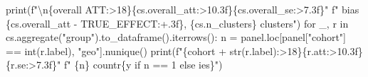 \documentclass[
  letterpaper,
  10pt,
  twoside,
  openright,
  numbers=noenddot,
  chapterprefix=true]{scrbook}
\newenvironment{Shaded}{}{}
\newcommand{\BuiltInTok}[1]{\textcolor[rgb]{0.84,0.23,0.29}{#1}}
\newcommand{\CharTok}[1]{\textcolor[rgb]{0.01,0.18,0.38}{#1}}
\newcommand{\ControlFlowTok}[1]{\textcolor[rgb]{0.84,0.23,0.29}{#1}}
\newcommand{\DecValTok}[1]{\textcolor[rgb]{0.00,0.36,0.77}{#1}}
\newcommand{\KeywordTok}[1]{\textcolor[rgb]{0.84,0.23,0.29}{#1}}
\newcommand{\NormalTok}[1]{\textcolor[rgb]{0.14,0.16,0.18}{#1}}
\newcommand{\OperatorTok}[1]{\textcolor[rgb]{0.14,0.16,0.18}{#1}}
\newcommand{\SpecialCharTok}[1]{\textcolor[rgb]{0.00,0.36,0.77}{#1}}
\newcommand{\SpecialStringTok}[1]{\textcolor[rgb]{0.01,0.18,0.38}{#1}}
\newcommand{\StringTok}[1]{\textcolor[rgb]{0.01,0.18,0.38}{#1}}
\begin{document}
\begin{Shaded}
\begin{Highlighting}[]
\BuiltInTok{print}\NormalTok{(}\SpecialStringTok{f"}\CharTok{\textbackslash{}n}\SpecialCharTok{\{}\StringTok{\textquotesingle{}overall ATT\textquotesingle{}}\SpecialCharTok{:\textgreater{}18\}\{}\NormalTok{cs}\SpecialCharTok{.}\NormalTok{overall\_att}\SpecialCharTok{:\textgreater{}10.3f\}\{}\NormalTok{cs}\SpecialCharTok{.}\NormalTok{overall\_se}\SpecialCharTok{:\textgreater{}7.3f\}}\SpecialStringTok{"}
      \SpecialStringTok{f"   bias }\SpecialCharTok{\{}\NormalTok{cs}\SpecialCharTok{.}\NormalTok{overall\_att }\OperatorTok{{-}}\NormalTok{ TRUE\_EFFECT}\SpecialCharTok{:+.3f\}}\SpecialStringTok{, }\SpecialCharTok{\{}\NormalTok{cs}\SpecialCharTok{.}\NormalTok{n\_clusters}\SpecialCharTok{\}}\SpecialStringTok{ clusters"}\NormalTok{)}
\ControlFlowTok{for}\NormalTok{ \_, r }\KeywordTok{in}\NormalTok{ cs.aggregate(}\StringTok{"group"}\NormalTok{).to\_dataframe().iterrows():}
\NormalTok{    n }\OperatorTok{=}\NormalTok{ panel.loc[panel[}\StringTok{"cohort"}\NormalTok{] }\OperatorTok{==} \BuiltInTok{int}\NormalTok{(r.label), }\StringTok{"geo"}\NormalTok{].nunique()}
    \BuiltInTok{print}\NormalTok{(}\SpecialStringTok{f"}\SpecialCharTok{\{}\StringTok{\textquotesingle{}cohort \textquotesingle{}} \OperatorTok{+} \BuiltInTok{str}\NormalTok{(r.label)}\SpecialCharTok{:\textgreater{}18\}\{}\NormalTok{r}\SpecialCharTok{.}\NormalTok{att}\SpecialCharTok{:\textgreater{}10.3f\}\{}\NormalTok{r}\SpecialCharTok{.}\NormalTok{se}\SpecialCharTok{:\textgreater{}7.3f\}}\SpecialStringTok{"}
          \SpecialStringTok{f"   }\SpecialCharTok{\{}\NormalTok{n}\SpecialCharTok{\}}\SpecialStringTok{ countr}\SpecialCharTok{\{}\StringTok{\textquotesingle{}y\textquotesingle{}} \ControlFlowTok{if}\NormalTok{ n }\OperatorTok{==} \DecValTok{1} \ControlFlowTok{else} \StringTok{\textquotesingle{}ies\textquotesingle{}}\SpecialCharTok{\}}\SpecialStringTok{"}\NormalTok{)}


\end{Highlighting}
\end{Shaded}
\end{document}

